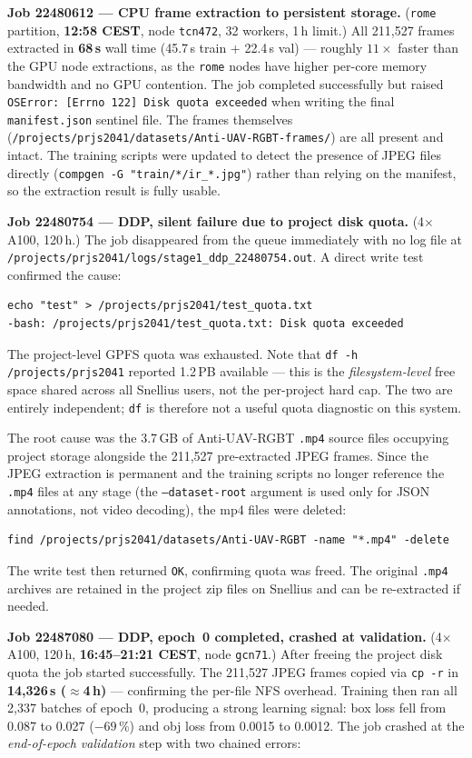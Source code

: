\textbf{Job 22480612 — CPU frame extraction to persistent storage.}
(\texttt{rome} partition, \textbf{12:58 CEST}, node \texttt{tcn472},
32 workers, 1\,h limit.) All 211,527 frames extracted in
\textbf{68\,s} wall time (45.7\,s train + 22.4\,s val) — roughly
$11\times$ faster than the GPU node extractions, as the \texttt{rome}
nodes have higher per-core memory bandwidth and no GPU contention.
The job completed successfully but raised
\texttt{OSError: [Errno 122] Disk quota exceeded} when writing the
final \texttt{manifest.json} sentinel file. The frames themselves
(\texttt{/projects/prjs2041/datasets/\allowbreak Anti-UAV-RGBT-frames/})
are all present and intact. The training scripts were updated to detect
the presence of JPEG files directly
(\texttt{compgen -G "train/*/ir\_*.jpg"})
rather than relying on the manifest, so the extraction result is fully usable.

\textbf{Job 22480754 — DDP, silent failure due to project disk quota.}
(4$\times$A100, 120\,h.) The job disappeared from the queue
immediately with no log file at
\texttt{/projects/prjs2041/logs/stage1\_ddp\_22480754.out}. A direct
write test confirmed the cause:
\begin{verbatim}
echo "test" > /projects/prjs2041/test_quota.txt
-bash: /projects/prjs2041/test_quota.txt: Disk quota exceeded
\end{verbatim}
The project-level GPFS quota was exhausted. Note that
\texttt{df -h /projects/prjs2041} reported 1.2\,PB available — this
is the \emph{filesystem-level} free space shared across all Snellius
users, not the per-project hard cap. The two are entirely independent;
\texttt{df} is therefore not a useful quota diagnostic on this system.

The root cause was the 3.7\,GB of Anti-UAV-RGBT \texttt{.mp4} source
files occupying project storage alongside the 211,527 pre-extracted
JPEG frames. Since the JPEG extraction is permanent and the training
scripts no longer reference the \texttt{.mp4} files at any stage
(the \texttt{--dataset-root} argument is used only for JSON
annotations, not video decoding), the mp4 files were deleted:
{\small\begin{verbatim}
find /projects/prjs2041/datasets/Anti-UAV-RGBT -name "*.mp4" -delete
\end{verbatim}}
The write test then returned \texttt{OK}, confirming quota was freed.
The original \texttt{.mp4} archives are retained in the project zip
files on Snellius and can be re-extracted if needed.

\textbf{Job 22487080 — DDP, epoch~0 completed, crashed at validation.}
(4$\times$A100, 120\,h, \textbf{16:45--21:21 CEST}, node \texttt{gcn71}.)
After freeing the project disk quota the job started successfully.
The 211,527 JPEG frames copied via \texttt{cp -r} in \textbf{14,326\,s
($\approx$4\,h)} — confirming the per-file NFS overhead. Training then
ran all 2,337 batches of epoch~0, producing a strong learning signal:
box loss fell from 0.087 to 0.027 ($-69\,\%$) and obj loss from 0.0015
to 0.0012. The job crashed at the \emph{end-of-epoch validation} step
with two chained errors:

